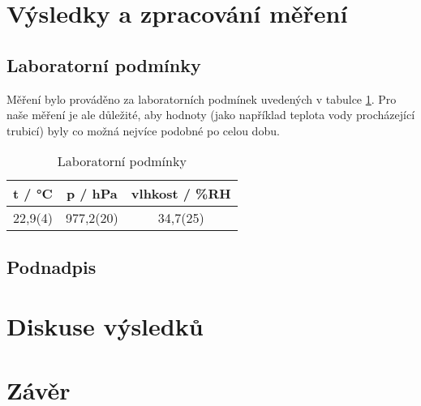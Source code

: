 \section{Výsledky a zpracování měření}

\subsection{Laboratorní podmínky}

    Měření bylo prováděno za laboratorních podmínek uvedených v tabulce \ref{tab:lab_pod}. Pro naše měření je ale důležité, aby hodnoty (jako například teplota vody procházející  trubicí) byly co možná nejvíce podobné po celou dobu.

    \begin{table}[h]
        \centering
        \caption{Laboratorní podmínky}
        \label{tab:lab_pod}
        \begin{tabular}{|c|c|c|} 
        \hline
            t / °C & p / hPa & vlhkost / \%RH  \\ 
        \hline
            22,9(4)   & 977,2(20)   & 34,7(25)            \\
        \hline
        \end{tabular}
    \end{table}

\subsection{Podnadpis}

    
\section{Diskuse výsledků}

\section{Závěr}
